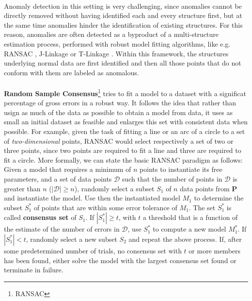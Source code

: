 \paragraph{}
Anomaly detection in this setting is very challenging, since anomalies cannot be directly removed without having identified each and every structure first, but at the same time anomalies hinder the identification of existing structures. For this reason, anomalies are often detected as a byproduct of a multi-structure estimation process, performed with robust model fitting algorithms, like e.g. RANSAC \cite{ransac}, J-Linkage \cite{j_linkage} or T-Linkage \cite{t_linkage}. Within this framework, the structures underlying normal data are first identified and then all those points that do not conform with them are labeled as anomalous.

\paragraph{}
\textbf{Random Sample Consensus}\footnote{RANSAC} tries to fit a model to a dataset with a significat percentage of gross errors in a robust way. It follows the idea that rather than usign as much of the data as possible to obtain a model from data, it uses as small an initial dataset as feasible and enlarges this set with consistent data when possible. For example, given the task of fitting a line or an arc of a circle to a set of \textit{two-dimensional} points, RANSAC would select respectively a set of two or three points, since two points are required to fit a line and three are required to fit a circle. \newline
More formally, we can state the basic RANSAC paradigm as follows: \newline
Given a model that requires a minimum of $n$ points to instantiate its free parameters, and a set of data points $\mathcal{D}$ such that the number of points in $\mathcal{D}$ is greater than $n$ ($|\mathcal{D}| \geq n$), randomly select a subset $S_1$ of $n$ data points from \textbf{P} and instantiate the model. Use then the instantiated model $M_1$ to determine the subset $S_1^*$ of points that are within some error tolerance of $M_1$. The set $S_1^*$ is called \textbf{consensus set} of $S_1$. \newline
If $|S_1^*| \geq t$, with $t$ a threshold that is a function of the estimate of the number of errors in $\mathcal{D}$, use $S_1^*$ to compute a new model $M_1^*$. \newline
If $|S_1^*| < t$, randomly select a new subset $S_2$ and repeat the above process. If, after some predetermined number of trials, no consensus set with $t$ or more members has been found, either solve the model with the largest consensus set found or terminate in failure. 

